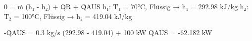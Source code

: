 0 = ṁ (h₁ - h₂) + Q̇R + Q̇AUS  
h₁: T₁ = 70°C, Flüssig → h₁ = 292.98 kJ/kg  
h₂: T₂ = 100°C, Flüssig → h₂ = 419.04 kJ/kg  

-Q̇AUS = 0.3 kg/s (292.98 - 419.04) + 100 kW  
Q̇AUS = -62.182 kW